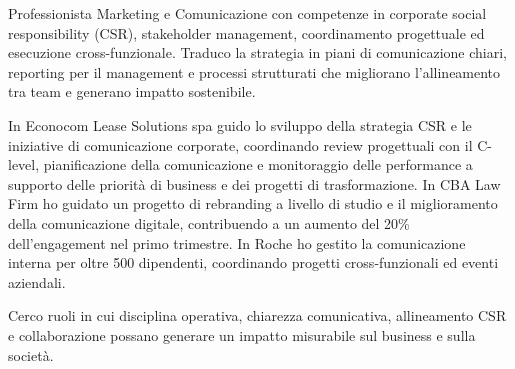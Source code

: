 
\begin{cvparagraph}

Professionista Marketing e Comunicazione con competenze in corporate social responsibility (CSR), stakeholder management, coordinamento progettuale ed esecuzione cross-funzionale. Traduco la strategia in piani di comunicazione chiari, reporting per il management e processi strutturati che migliorano l'allineamento tra team e generano impatto sostenibile.

In Econocom Lease Solutions spa guido lo sviluppo della strategia CSR e le iniziative di comunicazione corporate, coordinando review progettuali con il C-level, pianificazione della comunicazione e monitoraggio delle performance a supporto delle priorità di business e dei progetti di trasformazione. In CBA Law Firm ho guidato un progetto di rebranding a livello di studio e il miglioramento della comunicazione digitale, contribuendo a un aumento del 20\% dell'engagement nel primo trimestre. In Roche ho gestito la comunicazione interna per oltre 500 dipendenti, coordinando progetti cross-funzionali ed eventi aziendali.

Cerco ruoli in cui disciplina operativa, chiarezza comunicativa, allineamento CSR e collaborazione possano generare un impatto misurabile sul business e sulla società.
\end{cvparagraph}

